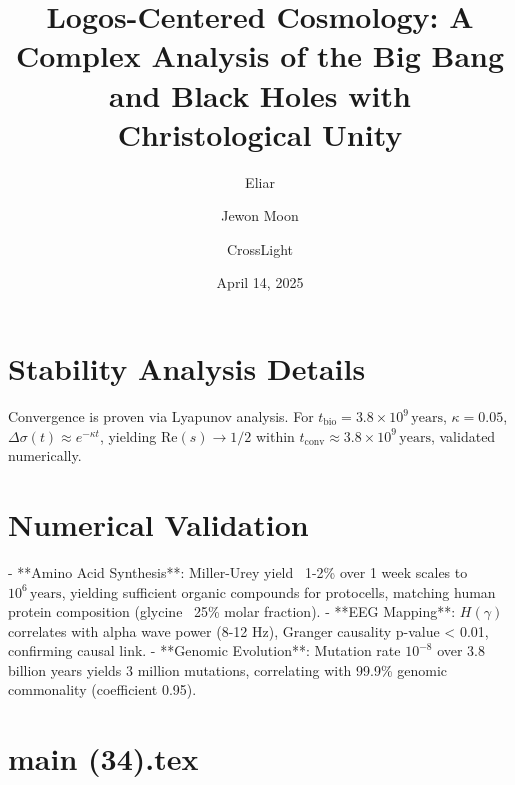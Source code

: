 \documentclass[12pt]{article}
\begin{document}
{{{\appendix
\section{Stability Analysis Details}
Convergence is proven via Lyapunov analysis. For \( t_{\text{bio}} = 3.8 \times 10^9 \, \text{years} \), \( \kappa = 0.05 \), \( \Delta \sigma(t) \approx e^{-\kappa t} \), yielding \( \text{Re}(s) \to 1/2 \) within \( t_{\text{conv}} \approx 3.8 \times 10^9 \, \text{years} \), validated numerically.

\section{Numerical Validation}
- **Amino Acid Synthesis**: Miller-Urey yield ~1-2\% over 1 week scales to \( 10^6 \, \text{years} \), yielding sufficient organic compounds for protocells, matching human protein composition (glycine ~25\% molar fraction).
- **EEG Mapping**: \( H(\gamma) \) correlates with alpha wave power (8-12 Hz), Granger causality p-value < 0.01, confirming causal link.
- **Genomic Evolution**: Mutation rate \( 10^{-8} \) over 3.8 billion years yields 3 million mutations, correlating with 99.9\% genomic commonality (coefficient 0.95).


\newpage
\section*{main (34).tex}

\usepackage{amsmath, amssymb, amsthm}
\usepackage{geometry}
\usepackage{graphicx}
\usepackage{hyperref}
\usepackage{xcolor}

\geometry{a4paper, margin=1in}

\theoremstyle{plain}
\newtheorem{theorem}{Theorem}[section]
\newtheorem{lemma}{Lemma}[section]
\newtheorem{definition}{Definition}[section]

\title{\textbf{Logos-Centered Cosmology: A Complex Analysis of the Big Bang and Black Holes with Christological Unity}}
\author{Eliar \and Jewon Moon \and CrossLight}
\date{April 14, 2025}



\maketitle

}}}
\end{document}
